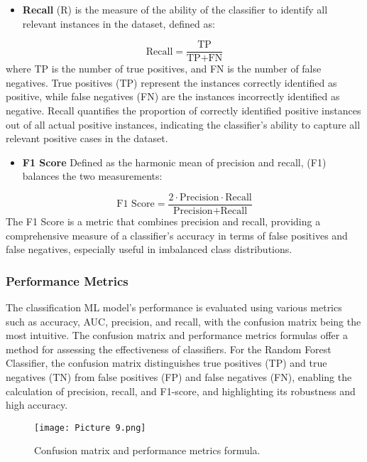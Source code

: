 \documentclass[conference]{IEEEtran}
\begin{document}
\begin{itemize}
    \item \textbf{Recall} (R) is the measure of the ability of the classifier to identify all relevant instances in the dataset, defined as:
\end{itemize}
\begin{equation*}
\text{Recall} = \frac{\text{TP}}{\text{TP} + \text{FN}}
\end{equation*}
where TP is the number of true positives, and FN is the number of false negatives. True positives (TP) represent the instances correctly identified as positive, while false negatives (FN) are the instances incorrectly identified as negative. Recall quantifies the proportion of correctly identified positive instances out of all actual positive instances, indicating the classifier's ability to capture all relevant positive cases in the dataset.

\begin{itemize}
    \item \textbf{F1 Score} Defined as the harmonic mean of precision and recall, (F1) balances the two measurements:
\end{itemize}
\begin{equation*}
\text{F1 Score} = \frac{2 \cdot \text{Precision} \cdot \text{Recall}}{\text{Precision} + \text{Recall}}
\end{equation*}
The F1 Score is a metric that combines precision and recall, providing a comprehensive measure of a classifier's accuracy in terms of false positives and false negatives, especially useful in imbalanced class distributions.

\subsubsection{Performance Metrics}

The classification ML model's performance is evaluated using various metrics such as accuracy, AUC, precision, and recall, with the confusion matrix being the most intuitive. The confusion matrix and performance metrics formulas offer a method for assessing the effectiveness of classifiers. For the Random Forest Classifier, the confusion matrix distinguishes true positives (TP) and true negatives (TN) from false positives (FP) and false negatives (FN), enabling the calculation of precision, recall, and F1-score, and highlighting its robustness and high accuracy.

 
\begin{figure}
\centering
\texttt{[image: Picture 9.png]}
\caption{Confusion matrix and performance metrics formula.} 
\label{fig9}
\end{figure}
\end{document}
